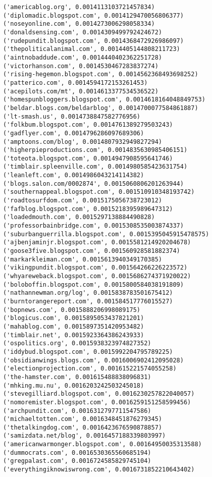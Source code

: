 \documentclass[11pt]{article}
\begin{document}
\begin{Verbatim}[commandchars=\\\{\}]
('americablog.org', 0.0014113103721457834)
('diplomadic.blogspot.com', 0.0014129470056806377)
('noseyonline.com', 0.0014273006298058334)
('donaldsensing.com', 0.0014309499792424672)
('rudepundit.blogspot.com', 0.0014368472926986097)
('thepoliticalanimal.com', 0.0014405144808211723)
('aintnobaddude.com', 0.0014440402362251728)
('victorhanson.com', 0.0014530467283837274)
('rising-hegemon.blogspot.com', 0.0014562368493698252)
('patterico.com', 0.0014594172153261453)
('acepilots.com/mt', 0.0014613377534536522)
('homespunbloggers.blogspot.com', 0.0014618164048849753)
('beldar.blogs.com/beldarblog', 0.0014700077584861887)
('lt-smash.us', 0.0014738847582776956)
('folkbum.blogspot.com', 0.0014761389279503243)
('gadflyer.com', 0.0014796286097689306)
('amptoons.com/blog', 0.0014807932949827294)
('higherpieproductions.com', 0.0014835630985406151)
('toteota.blogspot.com', 0.0014947908595641746)
('timblair.spleenville.com', 0.0014980585423631754)
('leanleft.com', 0.0014986043214114382)
('blogs.salon.com/0002874', 0.0015060806201263944)
('southernappeal.blogspot.com', 0.001510910348193742)
('roadtosurfdom.com', 0.0015175056738723012)
('fafblog.blogspot.com', 0.0015218395989647312)
('loadedmouth.com', 0.0015297138884490828)
('professorbainbridge.com', 0.0015308535003874337)
('suburbanguerrilla.blogspot.com', 0.0015395045915478575)
('ajbenjaminjr.blogspot.com', 0.0015581214920204678)
('goose3five.blogspot.com', 0.001560928581882374)
('markarkleiman.com', 0.0015613940349170385)
('vikingpundit.blogspot.com', 0.001564266226223572)
('whyareweback.blogspot.com', 0.0015686274371920022)
('boloboffin.blogspot.com', 0.0015800584038191809)
('nathannewman.org/log', 0.0015838783501675412)
('burntorangereport.com', 0.001584517776015527)
('bopnews.com', 0.0015888206998089175)
('blogicus.com', 0.0015895053437821201)
('mahablog.com', 0.0015897351420953482)
('timblair.net', 0.0015923364386243933)
('ospolitics.org', 0.0015938323974827352)
('iddybud.blogspot.com', 0.0015992204795789225)
('obsidianwings.blogs.com', 0.0016006902412095028)
('electionprojection.com', 0.001615221574055258)
('the-hamster.com', 0.001615488838096831)
('mhking.mu.nu', 0.0016203242503245018)
('stevegilliard.blogspot.com', 0.0016230257822040057)
('nomoremister.blogspot.com', 0.0016259151258599456)
('archpundit.com', 0.0016312797711547586)
('michaeltotten.com', 0.0016348451876279345)
('thetalkingdog.com', 0.0016423676590878857)
('samizdata.net/blog', 0.0016457188339803997)
('americanwarmonger.blogspot.com', 0.00164950035313588)
('dummocrats.com', 0.0016530365560685194)
('gregpalast.com', 0.0016724585829745104)
('everythingiknowiswrong.com', 0.0016731852210643402)

\end{Verbatim}
\end{document}
